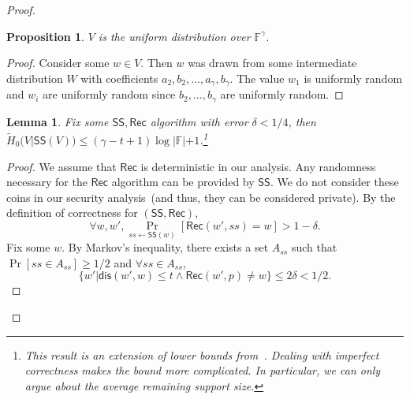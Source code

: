 \documentclass[11pt]{article}
\newcommand{\class}[1]{{\ensuremath{\mathsf{#1}}}}
\newcommand{\sketch}{\ensuremath{\class{SS}}\xspace}
\newcommand{\rec}{\ensuremath{\class{Rec}}\xspace}
\newcommand{\dis}{\ensuremath{\mathsf{dis}}}
\newtheorem{lemma}[theorem]{Lemma}
\newtheorem{proposition}[theorem]{Proposition}
\begin{document}
\begin{proof}
\begin{proposition}
\label{prop:distribution uniform} $V$ is the uniform distribution over $\mathbb{F}^\gamma$.
\end{proposition}
\begin{proof}
Consider some $w\in V$.  Then $w$ was drawn from some intermediate distribution $W$ with coefficients $a_2, b_2, ..., a_\gamma , b_\gamma$.  The value $w_1$ is uniformly random and $w_i$ are uniformly random since $b_2,..., b_\gamma$ are uniformly random.
\end{proof}
\begin{lemma}
\label{lem:secure sketch entropy loss}
Fix some $\sketch, \rec$ algorithm with error $\delta < 1/4$, then $\tilde{H}_0(V | \sketch(V)) \le (\gamma-t+1)\log |\mathbb{F}|+1$.\footnote{This result is an extension of lower bounds from~\cite[Appendix C]{DBLP:journals/siamcomp/DodisORS08}.  Dealing with imperfect correctness makes the bound more complicated.  In particular, we can only argue about the average remaining support size.}
\end{lemma}
\begin{proof}
We assume that $\rec$ is deterministic in our analysis.  Any randomness necessary for the \rec algorithm can be provided by \sketch.  We do not consider these coins in our security analysis~(and thus, they can be considered private).
By the definition of correctness for $(\sketch, \rec)$, 
\[
\forall w, w', \Pr_{ss\leftarrow \sketch(w)} [\rec(w', ss) = w] >1-\delta.
\]
Fix some $w$.  
By Markov's inequality, there exists a set $A_{ss}$ such that $\Pr[ss\in A_{ss}]\ge 1/2$ and $\forall ss\in A_{ss}$, 
\[
\{w' | \dis (w', w)\le t \wedge \rec(w', p) \neq w\}\le 2\delta < 1/2.\]


\end{proof}
\end{proof}
\end{document}
